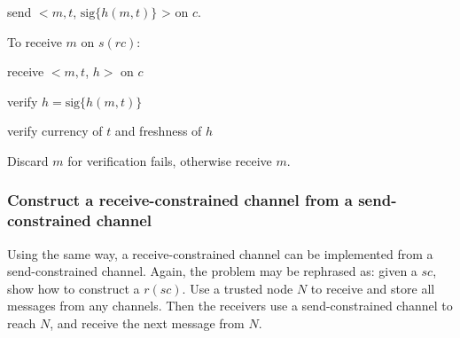 \documentclass[doc,natbib,12pt]{article}
\begin{document}
	\hspace{0.628in} send $< m, t$, $\text{sig}\{h(m,t)\}$ > on $c$.
	
	To receive $m$ on $s(rc)$:
	
	\hspace{0.628in} receive $< m, t$, $h > $ on $c$
	
	\hspace{0.628in} verify $h = \text{sig}\{h(m,t)\}$
	
	\hspace{0.628in} verify currency of $t$ and freshness of $h$
	
	\hspace{0.628in} Discard $m$ for verification fails, otherwise receive $m$.
	
	\subsubsection*{Construct a receive-constrained channel from a send-constrained channel}
	
	Using the same way, a receive-constrained channel can be implemented from a send-constrained channel. Again, the problem may be rephrased as: given a $sc$, show how to construct a $r(sc)$. Use a trusted node $N$ to receive and store all messages from any channels. Then the receivers use a send-constrained channel to reach $N$, and receive the next message from $N$.
	
\end{document}

